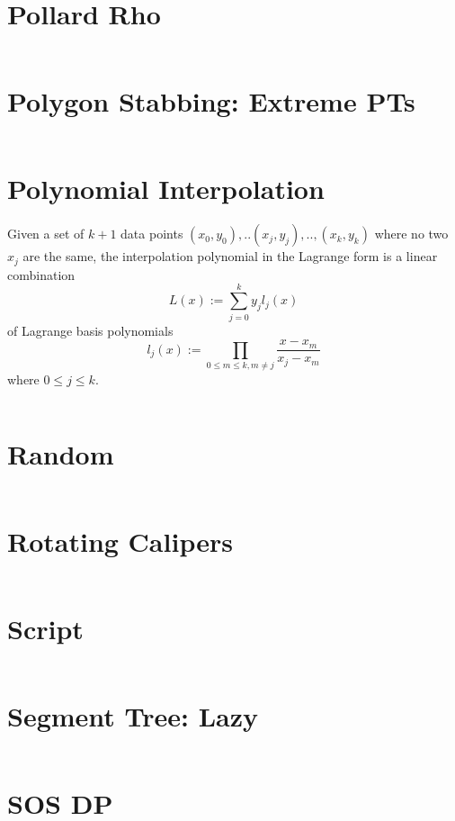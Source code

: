 \documentclass{article}
\begin{document}
\begin{multicols}{3}[
	\maketitle
    \begin{center}
        \rule{\textwidth}{2pt}
    \end{center}
]
\section{Pollard Rho}
\inputminted{cpp}{src/PollardRho.cc}

\section{Polygon Stabbing: Extreme PTs}
\inputminted{cpp}{src/PolygonStabbingConvex.cc}

\section{Polynomial Interpolation}
Given a set of $k + 1$ data points $(x_0, y_0),.. (x_j, y_j), .., (x_k, y_k)$ where no two $x_j$ are the same, the interpolation polynomial in the Lagrange form is a linear combination
\begin{equation*}
	L(x) := \sum\limits_{j=0}^{k} y_j l_j(x)
\end{equation*}
of Lagrange basis polynomials
\begin{equation*}
	l_j(x) :=  \prod\limits_{0 \le m \le k, m \neq j} \frac{x-x_m}{x_j-x_m}
\end{equation*}
where $0\leq j\leq k$.
\inputminted{cpp}{src/PolynomialInterpolation.cc}

\section{Random}
\inputminted{cpp}{src/Random.cc}

\section{Rotating Calipers}
\inputminted{cpp}{src/RotatingCalipers.cc}

\section{Script}
\inputminted{bash}{src/Script.sh}

\section{Segment Tree: Lazy}
\inputminted{cpp}{src/SegmentTree.cpp}

\section{SOS DP}
\inputminted{cpp}{src/SOSDP.cc}


\end{multicols}
\end{document}

